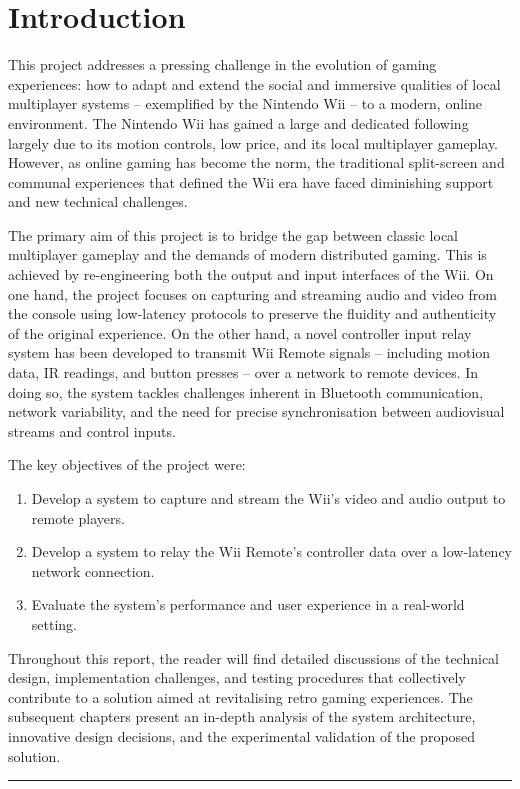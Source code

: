 \chapter{Introduction}
\hypertarget{chapter:introduction}{}

This project addresses a pressing challenge in the evolution of gaming experiences: how to adapt and extend the social and immersive qualities of local multiplayer systems -- exemplified by the Nintendo Wii -- to a modern, online environment. The Nintendo Wii has gained a large and dedicated following largely due to its motion controls, low price, and its local multiplayer gameplay. However, as online gaming has become the norm, the traditional split-screen and communal experiences that defined the Wii era have faced diminishing support and new technical challenges.

The primary aim of this project is to bridge the gap between classic local multiplayer gameplay and the demands of modern distributed gaming. This is achieved by re-engineering both the output and input interfaces of the Wii. On one hand, the project focuses on capturing and streaming audio and video from the console using low-latency protocols to preserve the fluidity and authenticity of the original experience. On the other hand, a novel controller input relay system has been developed to transmit Wii Remote signals -- including motion data, IR readings, and button presses -- over a network to remote devices. In doing so, the system tackles challenges inherent in Bluetooth communication, network variability, and the need for precise synchronisation between audiovisual streams and control inputs.

The key objectives of the project were:
\begin{enumerate}
\item  Develop a system to capture and stream the Wii’s video and audio output to remote players.
\item Develop a system to relay the Wii Remote’s controller data over a low-latency network connection.
\item Evaluate the system’s performance and user experience in a real-world setting.
\end{enumerate}

Throughout this report, the reader will find detailed discussions of the technical design, implementation challenges, and testing procedures that collectively contribute to a solution aimed at revitalising retro gaming experiences. The subsequent chapters present an in-depth analysis of the system architecture, innovative design decisions, and the experimental validation of the proposed solution.


\begin{center}
	\noindent\rule{8cm}{0.4pt}
\end{center}



